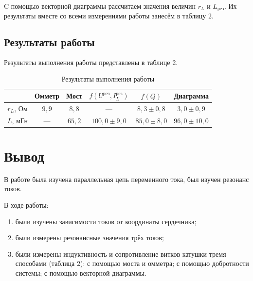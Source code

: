 \documentclass[a4paper]{article}
\theoremstyle{definition}
\theoremstyle{remark}
\begin{document}
C помощью векторной диаграммы рассчитаем значения величин $r_L$ и $L_{\text{рез}}$. Их результаты вместе со всеми измерениями работы занесём в таблицу 2.

\subsection{Результаты работы}

Результаты выполнения работы представлены в таблице 2.

\begin{table}[h!]
    \centering
    \caption{Результаты выполнения работы}
    \begin{tabular}{|c|c|c|c|c|c|}
    \hline
              & Омметр & Мост & $f(U^{\text{рез}}, I_L^{\text{рез}})$ & $f(Q)$ & Диаграмма \\ \hline
    $r_L$, Ом & $9,9$    & $8,8$  & ---       & $8,3 \pm 0,8$ & $3,0 \pm 0,9$       \\ \hline
    $L$, мГн  & ---    & $65,2$ & $100,0 \pm 9,0$     & $85,0 \pm 8,0$ & $96,0 \pm 10,0$      \\ \hline
    \end{tabular}
    \end{table}

\section{Вывод}

В работе была изучена параллельная цепь переменного тока, был изучен резонанс токов. \medskip

\noindent В ходе работы:
\begin{enumerate}
    \item были изучены зависимости токов от координаты сердечника;
    \item были измерены резонансные значения трёх токов;
    \item были измерены индуктивность и сопротивление витков катушки тремя способами (таблица 2): с помощью моста и омметра; с помощью добротности системы; с помощью векторной диаграммы.
\end{enumerate}
\end{document}
